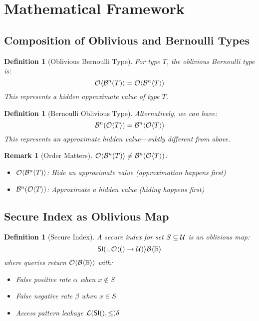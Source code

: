 \documentclass[11pt,final]{article}
\newcommand{\BernBool}{\mathcal{B}\langle \Bool \rangle}
\newcommand{\fprate}{\alpha}
\newcommand{\fnrate}{\beta}
\newtheorem{definition}[theorem]{Definition}
\newtheorem{remark}[theorem]{Remark}
\begin{document}
\section{Mathematical Framework}

\subsection{Composition of Oblivious and Bernoulli Types}

\begin{definition}[Oblivious Bernoulli Type]
For type $T$, the oblivious Bernoulli type is:
\begin{equation}
\Obv{\Bernoulli{T}{n}} = \Obv{\mathcal{B}^n\langle T \rangle}
\end{equation}
This represents a hidden approximate value of type $T$.
\end{definition}

\begin{definition}[Bernoulli Oblivious Type]
Alternatively, we can have:
\begin{equation}
\Bernoulli{\Obv{T}}{n} = \mathcal{B}^n\langle \Obv{T} \rangle
\end{equation}
This represents an approximate hidden value—subtly different from above.
\end{definition}

\begin{remark}[Order Matters]
$\Obv{\Bernoulli{T}{n}} \neq \Bernoulli{\Obv{T}}{n}$:
\begin{itemize}
    \item $\Obv{\Bernoulli{T}{n}}$: Hide an approximate value (approximation happens first)
    \item $\Bernoulli{\Obv{T}}{n}$: Approximate a hidden value (hiding happens first)
\end{itemize}
\end{remark}

\subsection{Secure Index as Oblivious Map}

\begin{definition}[Secure Index]
A secure index for set $S \subseteq \Universe$ is an oblivious map:
\begin{equation}
\SI: \ObvMap{\Universe}{\BernBool}
\end{equation}
where queries return $\Obv{\BernBool}$ with:
\begin{itemize}
    \item False positive rate $\fprate$ when $x \notin S$
    \item False negative rate $\fnrate$ when $x \in S$
    \item Access pattern leakage $\Leak{\SI} \leq \delta$
\end{itemize}
\end{definition}
\end{document}
